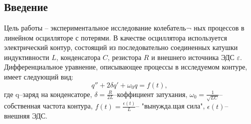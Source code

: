 
\usepackage{setspace}



\def\labauthors{Понур К.А., Сарафанов Ф.Г., Сидоров Д.А.}
\def\labgroup{420}
\def\labnumber{217}
\def\labtheme{Исследование колебательных процессов в электрическом контуре}
\renewcommand{\vec}{\mathbf}
\renewcommand{\Re}{\operatorname{Re}}
\renewcommand{\Im}{\operatorname{Im}}
\renewcommand{\phi}{\varphi}
\renewcommand{\kappa}{\varkappa}
\renewcommand{\hat}{\widehat}

\begin{spacing}{1}
\tableofcontents
\end{spacing}
\newpage


 \section{}
\subsection{Введение}
Цель работы -- экспериментальное исследование колебатель¬
ных процессов в линейном осцилляторе с потерями. В качестве осциллятора используется электрический
контур, состоящий из последовательно соединенных
катушки индуктивности $L$,
конденсатора $C$, резистора $R$
и внешнего источника ЭДС $\varepsilon$.
Дифференциальное уравнение, описывающее процессы в исследуемом контуре, имеет следующий вид:
\begin{equation}
	q''+2\delta q'+\omega_0 q=f(t),
\end{equation}
где q--заряд на конденсаторе, $\delta=\frac{R}{2L}$--коффициент затухания, $\omega_0=\frac{1}{\sqrt{LC}}$--собственная частота контура, $f(t)=\frac{\epsilon(t)}{L}$-- "вынужда.щая сила", $\epsilon(t)$-- внешняя ЭДС.
 

